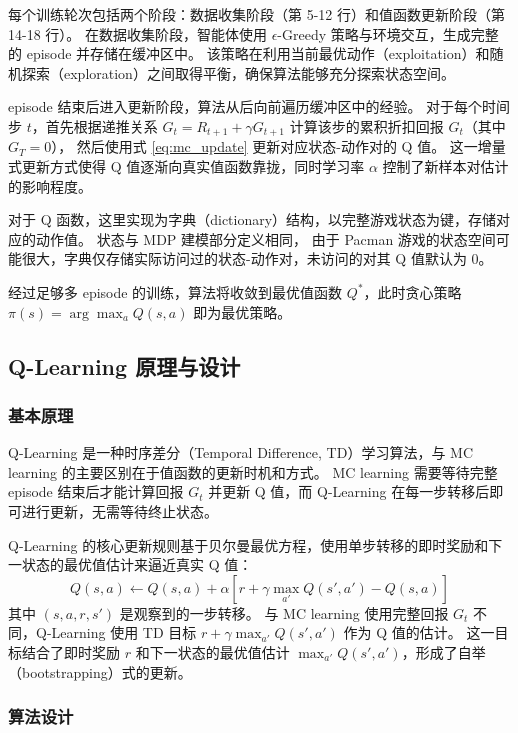 每个训练轮次包括两个阶段：数据收集阶段（第 5-12 行）和值函数更新阶段（第 14-18 行）。
在数据收集阶段，智能体使用 $\epsilon$-Greedy 策略与环境交互，生成完整的 episode 并存储在缓冲区中。
该策略在利用当前最优动作（exploitation）和随机探索（exploration）之间取得平衡，确保算法能够充分探索状态空间。

episode 结束后进入更新阶段，算法从后向前遍历缓冲区中的经验。
对于每个时间步 $t$，首先根据递推关系 $G_t = R_{t+1} + \gamma G_{t+1}$ 计算该步的累积折扣回报 $G_t$（其中 $G_T = 0$），
然后使用式 \eqref{eq:mc_update} 更新对应状态-动作对的 Q 值。
这一增量式更新方式使得 Q 值逐渐向真实值函数靠拢，同时学习率 $\alpha$ 控制了新样本对估计的影响程度。

对于 Q 函数，这里实现为字典（dictionary）结构，以完整游戏状态为键，存储对应的动作值。
状态与 MDP 建模部分定义相同，
由于 Pacman 游戏的状态空间可能很大，字典仅存储实际访问过的状态-动作对，未访问的对其 Q 值默认为 0。

经过足够多 episode 的训练，算法将收敛到最优值函数 $Q^*$，此时贪心策略 $\pi(s) = \arg\max_a Q(s,a)$ 即为最优策略。



\subsection{Q-Learning 原理与设计}

\subsubsection{基本原理}

Q-Learning 是一种时序差分（Temporal Difference, TD）学习算法，与 MC learning 的主要区别在于值函数的更新时机和方式。
MC learning 需要等待完整 episode 结束后才能计算回报 $G_t$ 并更新 Q 值，而 Q-Learning 在每一步转移后即可进行更新，无需等待终止状态。

Q-Learning 的核心更新规则基于贝尔曼最优方程，使用单步转移的即时奖励和下一状态的最优值估计来逼近真实 Q 值：
\begin{equation}
    \label{eq:q_learning_update}
    Q(s,a) \leftarrow Q(s,a) + \alpha \left[ r + \gamma \max_{a'} Q(s', a') - Q(s,a) \right]
\end{equation}
其中 $(s, a, r, s')$ 是观察到的一步转移。
与 MC learning 使用完整回报 $G_t$ 不同，Q-Learning 使用 TD 目标 $r + \gamma \max_{a'} Q(s', a')$ 作为 Q 值的估计。
这一目标结合了即时奖励 $r$ 和下一状态的最优值估计 $\max_{a'} Q(s', a')$，形成了自举（bootstrapping）式的更新。


\subsubsection{算法设计}

